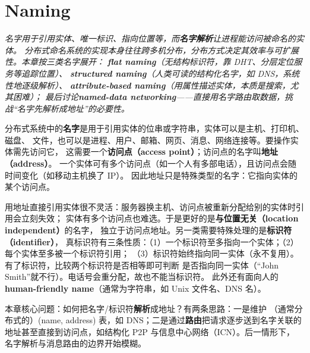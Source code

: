 \chapter{Naming}
\begin{center}
\begin{minipage}{0.9\textwidth}
\itshape\small\color{dsgray}
名字用于引用实体、唯一标识、指向位置等，而\textbf{名字解析}让进程能访问被命名的实体。
分布式命名系统的实现本身往往跨多机分布，分布方式决定其效率与可扩展性。本章按三类名字展开：
\textbf{flat naming}（无结构标识符，靠 DHT、分层定位服务等追踪位置）、
\textbf{structured naming}（人类可读的结构化名字，如 DNS，系统性地逐级解析）、
\textbf{attribute-based naming}（用属性描述实体，本质是搜索，尤其困难）；
最后讨论\textbf{named-data networking}——直接用名字路由取数据，挑战“名字先解析成地址”的必要性。
\end{minipage}
\end{center}


分布式系统中的\textbf{名字}是用于引用实体的位串或字符串，实体可以是主机、打印机、磁盘、
文件，也可以是进程、用户、邮箱、网页、消息、网络连接等。要操作实体需先访问它，
这需要一个\textbf{访问点（access point）}；访问点的名字叫\textbf{地址（address）}。
一个实体可有多个访问点（如一个人有多部电话），且访问点会随时间变化（如移动主机换了 IP）。
因此地址只是特殊类型的名字：它指向实体的某个访问点。

用地址直接引用实体很不灵活：服务器换主机、访问点被重新分配给别的实体时引用会立刻失效；
实体有多个访问点也难选。于是更好的是\textbf{与位置无关（location independent）}的名字，
独立于访问点地址。另一类需要特殊处理的是\textbf{标识符（identifier）}，
真标识符有三条性质：（1）一个标识符至多指向一个实体；（2）每个实体至多被一个标识符引用；
（3）标识符始终指向同一实体（永不复用）。有了标识符，比较两个标识符是否相等即可判断
是否指向同一实体（“John Smith”就不行）。电话号会重分配，故也不能当标识符。
此外还有面向人的 \textbf{human-friendly name}（通常为字符串，如 Unix 文件名、DNS 名）。

本章核心问题：如何把名字/标识符\textbf{解析}成地址？有两条思路：一是维护
（通常分布式的）(name, address) 表，如 DNS；二是通过\textbf{路由}把请求逐步送到名字关联的
地址甚至直接到访问点，如结构化 P2P 与信息中心网络（ICN）。后一情形下，
名字解析与消息路由的边界开始模糊。

